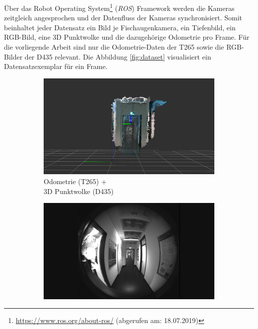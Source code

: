 Über das Robot Operating System\footnote{\url{https://www.ros.org/about-ros/} (abgerufen am: 18.07.2019)} (\textit{ROS}) Framework werden die Kameras zeitgleich angesprochen und der Datenfluss der Kameras synchronisiert. Somit beinhaltet jeder Datensatz ein Bild je Fischaugenkamera, ein Tiefenbild, ein RGB-Bild, eine 3D Punktwolke und die dazugehörige Odometrie pro Frame. Für die vorliegende Arbeit sind nur die Odometrie-Daten der T265 sowie die RGB-Bilder der D435 relevant. Die Abbildung \ref{fig:dataset} visualisiert ein Datensatzexemplar für ein Frame.


\begin{figure}[H]
	\centering
	\begin{subfigure}[t]{0.3\linewidth}
		\centering
		\includegraphics[width=\linewidth]{images/real_dataset/pointcloud3.png}
		\caption{Odometrie  (T265) + \\ 3D Punktwolke (D435)}
		\label{subfig:odom1}
	\end{subfigure}
	\hfill
	\begin{subfigure}[t]{0.3\linewidth}
		\centering
		\includegraphics[width=\linewidth]{images/real_dataset/f1_frame000005.png}

\end{subfigure}
\end{figure}
